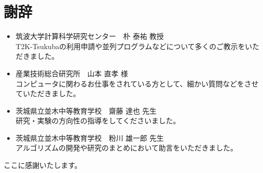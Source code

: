 \section{謝辞}
\begin{itemize}
	\item 筑波大学計算科学研究センター　朴 泰祐 教授	\\
		T2K-Tsukubaの利用申請や並列プログラムなどについて多くのご教示をいただきました。 

	\item 産業技術総合研究所　山本 直孝 様	\\
		コンピュータに関わるお仕事をされている方として、細かい質問などをさせていただきました。

	\item 茨城県立並木中等教育学校　齋藤 達也 先生	\\
		研究・実験の方向性の指導をしてくださいました。

	\item 茨城県立並木中等教育学校　粉川 雄一郎 先生	\\
		アルゴリズムの開発や研究のまとめにおいて助言をいただきました。
\end{itemize}
ここに感謝いたします。
